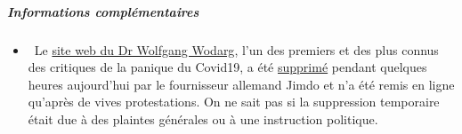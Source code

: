 \hypertarget{informations-compluxe9mentaires}{%
\subparagraph{\texorpdfstring{\textbf{Informations
complémentaires}}{Informations complémentaires}}\label{informations-compluxe9mentaires}}

\begin{itemize}
\tightlist
\item
  ~Le \href{http://wodarg.com/}{site web du Dr Wolfgang Wodarg}, l'un
  des premiers et des plus connus des critiques de la panique du
  Covid19, a été \href{https://twitter.com/wodarg}{supprimé} pendant
  quelques heures aujourd'hui par le fournisseur allemand Jimdo et n'a
  été remis en ligne qu'après de vives protestations. On ne sait pas si
  la suppression temporaire était due à des plaintes générales ou à une
  instruction politique.
\end{itemize}

